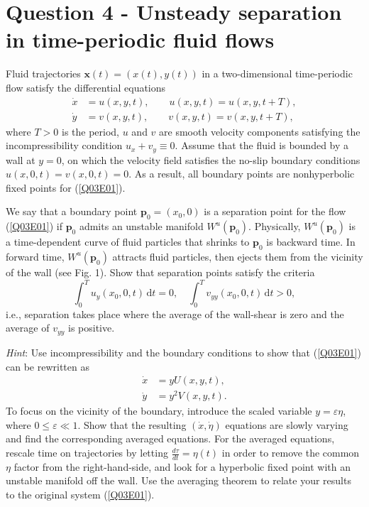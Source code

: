 \documentclass[twoside,10pt,a4paper]{article}
\begin{document}
\section*{Question 4 - Unsteady separation in time-periodic fluid flows}
Fluid trajectories $\mathbf{x}(t) = (x(t),y(t))$ in a two-dimensional time-periodic flow satisfy the differential equations
\begin{equation}\label{Q03E01}
	\begin{aligned}
		\dot{x} &= u(x,y,t), \qquad u(x,y,t) = u(x,y,t+T), \\
		\dot{y} &= v(x,y,t), \qquad v(x,y,t) = v(x,y,t+T),
	\end{aligned}
\end{equation}
where $T>0$ is the period, $u$ and $v$ are smooth velocity components satisfying the incompressibility condition $u_x + v_y \equiv 0$. Assume that the fluid is bounded by a wall at $y=0$, on which the velocity field satisfies the no-slip boundary conditions $u(x,0,t) = v(x,0,t)=0$. As a result, all boundary points are nonhyperbolic fixed points for (\ref{Q03E01}).

We say that a boundary point $\mathbf{p}_0 = (x_0,0)$ is a separation point for the flow (\ref{Q03E01}) if $\mathbf{p}_0$ admits an unstable manifold $W^u(\mathbf{p}_0)$. Physically, $W^u(\mathbf{p}_0)$ is a time-dependent curve of fluid particles that shrinks to $\mathbf{p}_0$ is backward time. In forward time, $W^u(\mathbf{p}_0)$ attracts fluid particles, then ejects them from the vicinity of the wall (see Fig. 1). Show that separation points satisfy the criteria
\begin{equation*}
	\int_0^T u_y(x_0,0,t) \, \text{d}t = 0, \quad \int_0^T v_{yy}(x_0,0,t)\, \text{d}t > 0,
\end{equation*}
i.e., separation takes place where the average of the wall-shear is zero and the average of $v_{yy}$ is positive.

\textit{Hint}: Use incompressibility and the boundary conditions to show that (\ref{Q03E01}) can be rewritten as
\begin{align*}
	\dot{x} &= yU(x,y,t), \\
	\dot{y} &= y^2V(x,y,t).
\end{align*}
To focus on the vicinity of the boundary, introduce the scaled variable $y=\varepsilon \eta$, where $0 \leq \varepsilon \ll 1$. Show that the resulting $(\dot{x},\dot{\eta})$ equations are slowly varying and find the corresponding averaged equations. For the averaged equations, rescale time on trajectories by letting $\frac{d\tau}{dt} = \eta(t)$ in order to remove the common $\eta$ factor from the right-hand-side, and look for a hyperbolic fixed point with an unstable manifold off the wall. Use the averaging theorem to relate your results to the original system (\ref{Q03E01}).
\end{document}
